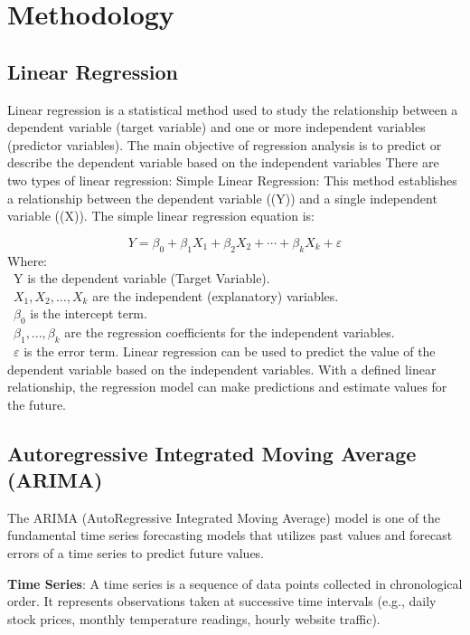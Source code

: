 \documentclass{ieeeojies}
\begin{document}
\section{Methodology}
\subsection{Linear Regression}
Linear regression\cite{b9} is a statistical method used to study the relationship between a dependent variable (target variable) and one or more independent variables (predictor variables). The main objective of regression analysis is to predict or describe the dependent variable based on the independent variables
There are two types of linear regression: 
\newline  Simple Linear Regression: This method establishes a relationship between the dependent variable ((Y)) and a single independent variable ((X)). The simple linear regression equation is:

\[Y=\beta_0+\beta_1X_1+\beta_2X_2+\cdots+\beta_kX_k+\varepsilon\]
Where:\\
	\indent\textbullet\ Y is the dependent variable (Target Variable).\\
	\indent\textbullet\ \(X_1, X_2, \ldots, X_k\) are the independent (explanatory) variables.\\
	\indent\textbullet\ \(\beta_0\) is the intercept term.\\
	\indent\textbullet\ \(\beta_1,..., \beta_k\) are the regression coefficients for the independent variables.\\
	\indent\textbullet\ \(\varepsilon\) is the error term.
\newline Linear regression can be used to predict the value of the dependent variable based on the independent variables. With a defined linear relationship, the regression model can make predictions and estimate values for the future.
 \subsection{Autoregressive Integrated Moving Average (ARIMA)}

The ARIMA\cite{b10} (AutoRegressive Integrated Moving Average) model is one of the fundamental time series forecasting models that utilizes past values and forecast errors of a time series to predict future values.

\textbf{Time Series}: A time series is a sequence of data points collected in chronological order. It represents observations taken at successive time intervals (e.g., daily stock prices, monthly temperature readings, hourly website traffic).
\end{document}
